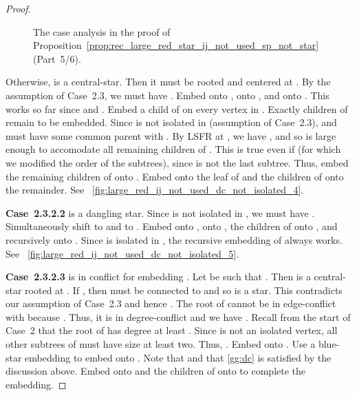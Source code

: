 \documentclass[11pt,a4paper,colorlinks=true,urlcolor=blue,citecolor=red]{article}
\theoremstyle{plain}
\newcommand{\case}[1]{\par\vspace{.5\baselineskip}\noindent\textbf{\sffamily Case~#1}}
\begin{document}
\begin{proof}
  \begin{figure}
    \centering\hfil {}\hfil {}\hfil {}\hfil {}\hfil \caption{The case analysis in the proof of
      Proposition~\ref{prop:rec_large_red_star_ij_not_used_sp_not_star}~(Part~5/6).}
  \end{figure}

  Otherwise,  is a central-star. Then it must be rooted and
  centered at . By the assumption of Case~2.3, we must have .
  Embed  onto ,  onto , and  onto . This works so far
  since  and
  . Embed a child of  on
  every vertex in . Exactly  children of  remain
  to be embedded. Since  is not isolated in  (assumption
  of Case~2.3),  and  must have some common parent  with
  . By LSFR at , we have
  , and so  is large enough to
  accomodate all remaining children of . This is true even if 
  (for which we modified the order of the subtrees), since  is not
  the last subtree. Thus, embed the remaining children of  onto
  . Embed  onto the leaf  of  and the
  children of  onto the remainder. See
  \figurename~\ref{fig:large_red_ij_not_used_dc_not_isolated_4}.

  \case{2.3.2.2}  is a dangling star. Since  is not
  isolated in , we must have . Simultaneously
  shift  to  and  to . Embed  onto ,
   onto , the children of  onto , and 
  recursively onto . Since  is isolated in , the
  recursive embedding of  always works. See
  \figurename~\ref{fig:large_red_ij_not_used_dc_not_isolated_5}.

  \case{2.3.2.3}  is in conflict for embedding . Let
   be such that . Then  is a
  central-star rooted at . If , then  must be connected to
   and so  is a star. This contradicts our assumption of
  Case~2.3 and hence . The root  of  cannot be in
  edge-conflict with  because . Thus, it is
  in degree-conflict and we have .
  Recall from the start of Case~2 that the root of  has degree
  at least . Since  is not an isolated vertex, all other
  subtrees of  must have size at least two. Thus,
  . Embed  onto . Use a
  blue-star embedding to embed  onto . Note that
   and that \ref{gg:dc} is satisfied by the
  discussion above. Embed  onto  and the children of  onto
   to complete the embedding.


\end{proof}
\end{document}
